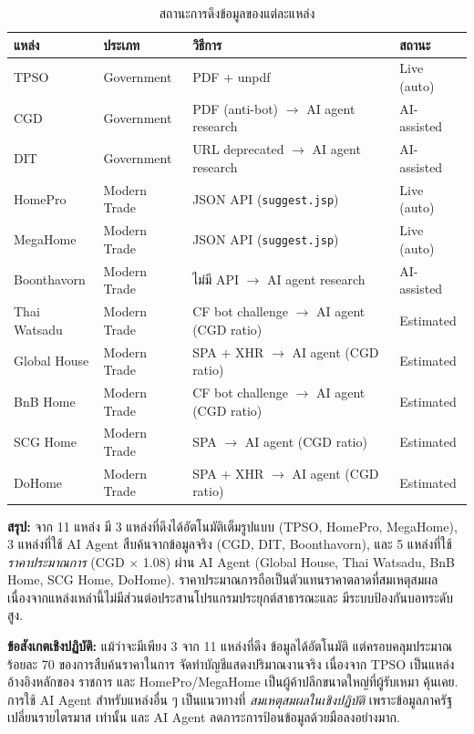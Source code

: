 \begin{table}[H]
\centering
\caption{สถานะการดึงข้อมูลของแต่ละแหล่ง}
\label{tab:scrape-status}
\begin{tabularx}{\textwidth}{l X X X}
\toprule
\textbf{แหล่ง} & \textbf{ประเภท} & \textbf{วิธีการ} & \textbf{สถานะ} \\
\midrule
TPSO         & Government   & PDF $+$ unpdf                                & Live (auto) \\
CGD          & Government   & PDF (anti-bot) $\to$ AI agent research        & AI-assisted \\
DIT          & Government   & URL deprecated $\to$ AI agent research        & AI-assisted \\
HomePro      & Modern Trade & JSON API (\texttt{suggest.jsp})              & Live (auto) \\
MegaHome     & Modern Trade & JSON API (\texttt{suggest.jsp})              & Live (auto) \\
Boonthavorn  & Modern Trade & ไม่มี API $\to$ AI agent research              & AI-assisted \\
Thai Watsadu & Modern Trade & CF bot challenge $\to$ AI agent (CGD ratio)   & Estimated \\
Global House & Modern Trade & SPA $+$ XHR $\to$ AI agent (CGD ratio)        & Estimated \\
BnB Home     & Modern Trade & CF bot challenge $\to$ AI agent (CGD ratio)   & Estimated \\
SCG Home     & Modern Trade & SPA $\to$ AI agent (CGD ratio)               & Estimated \\
DoHome       & Modern Trade & SPA $+$ XHR $\to$ AI agent (CGD ratio)        & Estimated \\
\bottomrule
\end{tabularx}
\end{table}

\textbf{สรุป:} จาก 11 แหล่ง มี 3 แหล่งที่ดึงได้อัตโนมัติเต็มรูปแบบ
(TPSO, HomePro, MegaHome), 3 แหล่งที่ใช้ AI Agent สืบค้นจากข้อมูลจริง
(CGD, DIT, Boonthavorn), และ 5 แหล่งที่ใช้ \emph{ราคาประมาณการ}
(CGD $\times$ 1.08) ผ่าน AI Agent (Global House, Thai Watsadu, BnB Home,
SCG Home, DoHome). ราคาประมาณการถือเป็นตัวแทนราคาตลาดที่สมเหตุสมผล
เนื่องจากแหล่งเหล่านี้ไม่มีส่วนต่อประสานโปรแกรมประยุกต์สาธารณะและ
มีระบบป้องกันบอทระดับสูง.

\textbf{ข้อสังเกตเชิงปฏิบัติ:} แม้ว่าจะมีเพียง 3 จาก 11 แหล่งที่ดึง
ข้อมูลได้อัตโนมัติ แต่ครอบคลุมประมาณร้อยละ 70 ของการสืบค้นราคาในการ
จัดทำบัญชีแสดงปริมาณงานจริง เนื่องจาก TPSO เป็นแหล่งอ้างอิงหลักของ
ราชการ และ HomePro/MegaHome เป็นผู้ค้าปลีกขนาดใหญ่ที่ผู้รับเหมา
คุ้นเคย. การใช้ AI Agent สำหรับแหล่งอื่น ๆ เป็นแนวทางที่
\emph{สมเหตุสมผลในเชิงปฏิบัติ} เพราะข้อมูลภาครัฐเปลี่ยนรายไตรมาส
เท่านั้น และ AI Agent ลดภาระการป้อนข้อมูลด้วยมือลงอย่างมาก.

